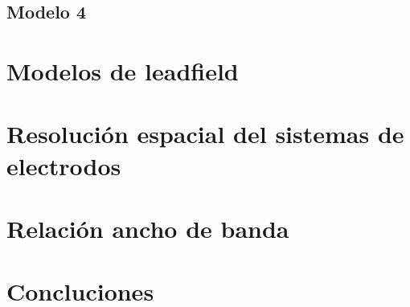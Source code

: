 \subsection{Modelo 4}

\section{Modelos de leadfield}

\section{Resolución espacial del sistemas de electrodos}
\section{Relación ancho de banda}


\section{Concluciones}
